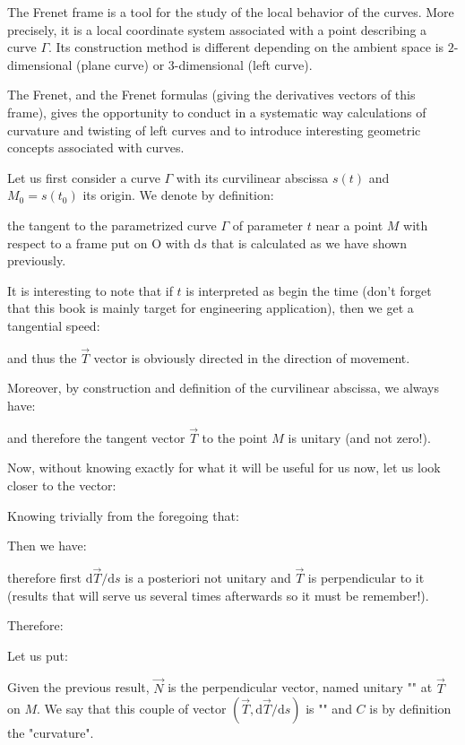{	The Frenet frame is a tool for the study of the local behavior of the curves. More precisely, it is a local coordinate system associated with a point describing a curve $\Gamma$. Its construction method is different depending on the ambient space is $2$-dimensional (plane curve) or $3$-dimensional (left curve).
	
	The Frenet, and the Frenet formulas (giving the derivatives vectors of this frame), gives the opportunity to conduct in a systematic way calculations of curvature and twisting of left curves and to introduce interesting geometric concepts associated with curves.
	
	Let us first consider a curve $\Gamma$ with its curvilinear abscissa $s(t)$ and $M_0=s(t_0)$ its origin. We denote by definition:
	
	the tangent to the parametrized curve $\Gamma$ of parameter $t$ near a point $M$ with respect to a frame put on O with $\mathrm{d}s$ that is calculated as we have shown previously.
	
	It is interesting to note that if $t$ is interpreted as begin the time (don't forget that this book is mainly target for engineering application), then we get a tangential speed:
	
	and thus the  $\vec{T}$ vector is obviously directed in the direction of movement.
	
	Moreover, by construction and definition of the curvilinear abscissa, we always have:
	
	and therefore the tangent vector $\vec{T}$ to the point $M$ is unitary (and not zero!).
	
	Now, without knowing exactly for what it will be useful for us now, let us look closer to the vector:
	
	Knowing trivially from the foregoing that:
	
	Then we have:
	
	therefore first $\mathrm{d}\vec{T}/\mathrm{d}s$ is a posteriori not unitary and $\vec{T}$ is perpendicular to it (results that will serve us several times afterwards so it must be remember!).
	
	Therefore:
	
	
	Let us put:
	
	Given the previous result, $\vec{N}$ is the perpendicular vector, named unitary "" at $\vec{T}$ on $M$. We say that this couple of vector $\left(\vec{T},\mathrm{d}\vec{T}/\mathrm{d}s\right)$ is "" and $C$ is by definition the "curvature".
	
}
